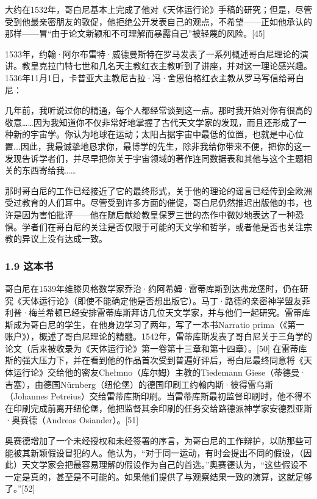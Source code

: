 大约在1532年，哥白尼基本上完成了他对《天体运行论》手稿的研究；但是，尽管受到他最亲密朋友的敦促，他拒绝公开发表自己的观点，不希望——正如他承认的那样——冒“由于论文新颖和不可理解而暴露自己”被轻蔑的风险。[45]

1533年，约翰·阿尔布雷特·威德曼斯特在罗马发表了一系列概述哥白尼理论的演讲。教皇克拉门特七世和几名天主教红衣主教听到了讲座，并对这一理论感兴趣。1536年11月1日，卡普亚大主教尼古拉·冯·舍恩伯格红衣主教从罗马写信给哥白尼：

几年前，我听说过你的精通，每个人都经常谈到这一点。那时我开始对你有很高的敬意……因为我知道你不仅非常好地掌握了古代天文学家的发现，而且还形成了一种新的宇宙学。你认为地球在运动；太阳占据宇宙中最低的位置，也就是中心位置...因此，我最诚挚地恳求你，最博学的先生，除非我给你带来不便，把你的这一发现告诉学者们，并尽早把你关于宇宙领域的著作连同数据表和其他与这个主题相关的东西寄给我……

那时哥白尼的工作已经接近了它的最终形式，关于他的理论的谣言已经传到全欧洲受过教育的人们耳中。尽管受到许多方面的催促，哥白尼仍然推迟出版他的书，也许是因为害怕批评——他在随后献给教皇保罗三世的杰作中微妙地表达了一种恐惧。学者们在哥白尼的关注是否仅限于可能的天文学和哲学，或者他是否也关注宗教的异议上没有达成一致。

\subsubsection{1.9 这本书}
哥白尼在1539年维滕贝格数学家乔治·约阿希姆·雷蒂库斯到达弗龙堡时，仍在研究《天体运行论》（即使不能确定他是否想出版它）。马丁·路德的亲密神学盟友菲利普·梅兰希顿已经安排雷蒂库斯拜访几位天文学家，并与他们一起研究。雷蒂库斯成为哥白尼的学生，在他身边学习了两年，写了一本书Narratio prima（《第一账户》），概述了哥白尼理论的精髓。1542年，雷蒂库斯发表了哥白尼关于三角学的论文（后来被收录为《天体运行论》第一卷第十三章和第十四章）。[50] 在雷蒂库斯的强大压力下，并在看到他的作品首次受到普遍好评后，哥白尼最终同意将《天体运行论》交给他的密友Chełmno（库尔姆）主教的Tiedemann Giese（蒂德曼·吉塞），由德国Nürnberg（纽伦堡）的德国印刷工约翰内斯·彼得雷乌斯（Johannes Petreius）交给雷蒂库斯印刷。当雷蒂库斯最初监督印刷时，他不得不在印刷完成前离开纽伦堡，他把监督其余印刷的任务交给路德派神学家安德烈亚斯·奥赛德（Andreas Osiander）。[51]

奥赛德增加了一个未经授权和未经签署的序言，为哥白尼的工作辩护，以防那些可能被其新颖假设冒犯的人。他认为，“对于同一运动，有时会提出不同的假设，（因此）天文学家会把最容易理解的假设作为自己的首选。”奥赛德认为，“这些假设不一定是真的，甚至是不可能的。如果他们提供了与观察结果一致的演算，这就足够了。”[52]

